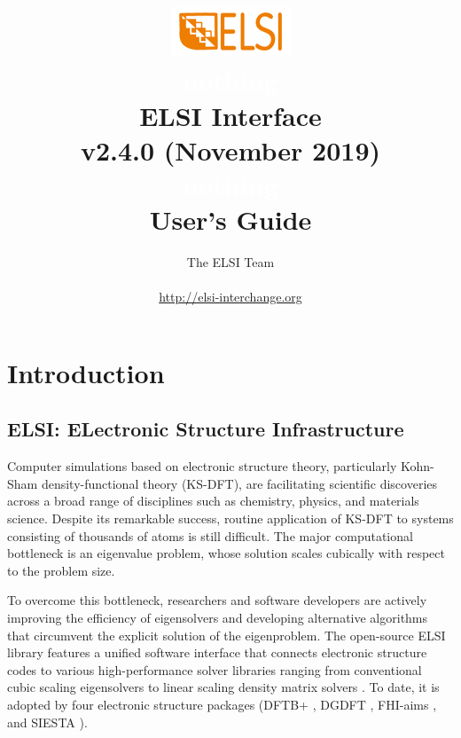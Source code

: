 \documentclass{report}
\begin{document}
\title{\includegraphics[scale=0.07]{elsi_logo.png}\\ \textcolor{white}{nothing}\\ \textbf{ELSI Interface\\ v2.4.0 (November 2019)\\ \textcolor{white}{nothing} \\ User's Guide}}
\author{The ELSI Team\\ \textcolor{white}{nothing}\\ \url{http://elsi-interchange.org}}
\maketitle

\tableofcontents

\chapter{Introduction}
\section{ELSI: ELectronic Structure Infrastructure}
\label{sec:elsi}
Computer simulations based on electronic structure theory, particularly Kohn-Sham density-functional theory (KS-DFT), are facilitating scientific discoveries across a broad range of disciplines such as chemistry, physics, and materials science. Despite its remarkable success, routine application of KS-DFT to systems consisting of thousands of atoms is still difficult. The major computational bottleneck is an eigenvalue problem, whose solution scales cubically with respect to the problem size.

To overcome this bottleneck, researchers and software developers are actively improving the efficiency of eigensolvers and developing alternative algorithms that circumvent the explicit solution of the eigenproblem. The open-source ELSI library features a unified software interface that connects electronic structure codes to various high-performance solver libraries ranging from conventional cubic scaling eigensolvers to linear scaling density matrix solvers \cite{elsi_yu_2018}. To date, it is adopted by four electronic structure packages (DFTB+ \cite{dftb_aradi_2007}, DGDFT \cite{dgdft_hu_2015}, FHI-aims \cite{fhiaims_blum_2009}, and SIESTA \cite{siesta_soler_2002}).
\end{document}
